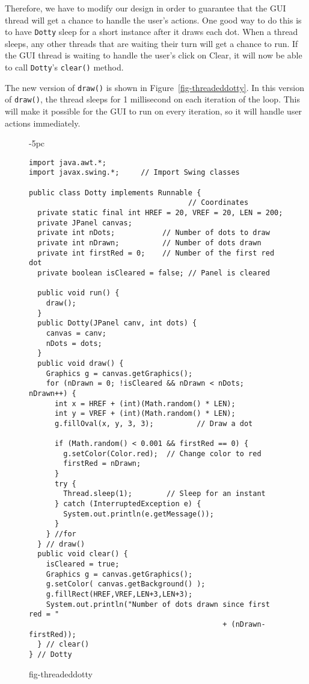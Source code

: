 \noindent Therefore, we have to modify our design in order to guarantee that the
GUI thread will get a chance to handle the user's actions.   One
good way to do this is to have {\tt Dotty} sleep for a short
instance after it draws each dot.  When a thread sleeps, any other
threads that are waiting their turn will get a chance to run.  If the
GUI thread is waiting to handle the user's click on Clear, it
will now be able to call {\tt Dotty}'s {\tt clear()} method.

The new version of {\tt draw()} is shown in
Figure~\ref{fig-threadeddotty}.  In this version of {\tt draw()}, the
thread sleeps for 1 millisecond on each iteration of the loop.  This
will make it possible for the GUI to run on every iteration, so it
will handle user actions immediately.

\begin{figure}[p]
\jjjprogstart
\begin{jjjlistingleft}[31pc]{-5pc}
\begin{lstlisting}
import java.awt.*;
import javax.swing.*;     // Import Swing classes

public class Dotty implements Runnable {
                                     // Coordinates
  private static final int HREF = 20, VREF = 20, LEN = 200; 
  private JPanel canvas;
  private int nDots;           // Number of dots to draw
  private int nDrawn;          // Number of dots drawn
  private int firstRed = 0;    // Number of the first red dot
  private boolean isCleared = false; // Panel is cleared

  public void run() {
    draw();
  }
  public Dotty(JPanel canv, int dots) {
    canvas = canv;
    nDots = dots;
  }
  public void draw() {
    Graphics g = canvas.getGraphics();
    for (nDrawn = 0; !isCleared && nDrawn < nDots; nDrawn++) {
      int x = HREF + (int)(Math.random() * LEN);
      int y = VREF + (int)(Math.random() * LEN);
      g.fillOval(x, y, 3, 3);          // Draw a dot

      if (Math.random() < 0.001 && firstRed == 0) {
        g.setColor(Color.red);  // Change color to red
        firstRed = nDrawn;
      }
      try {
        Thread.sleep(1);        // Sleep for an instant
      } catch (InterruptedException e) {
        System.out.println(e.getMessage());
      }
    } //for
  } // draw()
  public void clear() {
    isCleared = true;
    Graphics g = canvas.getGraphics();
    g.setColor( canvas.getBackground() );
    g.fillRect(HREF,VREF,LEN+3,LEN+3);
    System.out.println("Number of dots drawn since first red = "
                                             + (nDrawn-firstRed));
  } // clear()
} // Dotty
\end{lstlisting}
\end{jjjlistingleft}
{fig-threadeddotty}
\end{figure}

